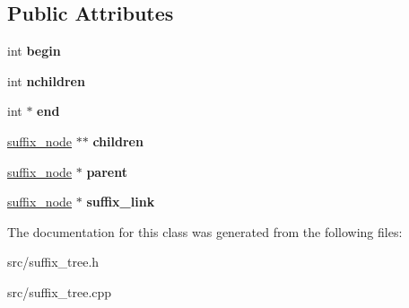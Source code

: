 \subsection*{Public Attributes}
\begin{DoxyCompactItemize}
\item 
\mbox{\label{classsuffix__node_a9de4356329d9fd07511bcc4ee080df50}} 
int {\bfseries begin}
\item 
\mbox{\label{classsuffix__node_a52e5a4ab12e08966e38db512ed6316dc}} 
int {\bfseries nchildren}
\item 
\mbox{\label{classsuffix__node_af3d0857764f653e1a0f622af5215a4a0}} 
int $\ast$ {\bfseries end}
\item 
\mbox{\label{classsuffix__node_ac60ca6423a4769832874c1a6efe3d1c1}} 
\mbox{\hyperlink{classsuffix__node}{suffix\+\_\+node}} $\ast$$\ast$ {\bfseries children}
\item 
\mbox{\label{classsuffix__node_a3034292aaf83597ce658f45438c89133}} 
\mbox{\hyperlink{classsuffix__node}{suffix\+\_\+node}} $\ast$ {\bfseries parent}
\item 
\mbox{\label{classsuffix__node_a7d19dcd69e8b91ecbde055f7c4d86048}} 
\mbox{\hyperlink{classsuffix__node}{suffix\+\_\+node}} $\ast$ {\bfseries suffix\+\_\+link}
\end{DoxyCompactItemize}


The documentation for this class was generated from the following files\+:\begin{DoxyCompactItemize}
\item 
src/suffix\+\_\+tree.\+h\item 
src/suffix\+\_\+tree.\+cpp\end{DoxyCompactItemize}

